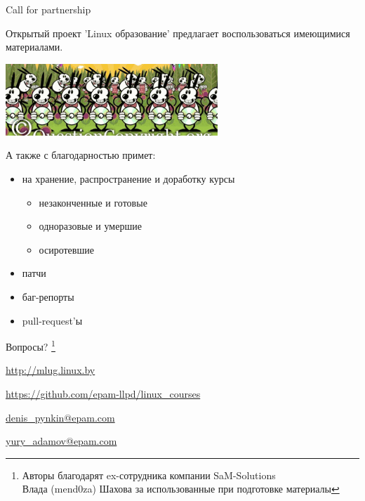 \begin{frame}{Call for partnership}
  
  \begin{center}
    Открытый проект 'Linux образование' предлагает воспользоваться имеющимися материалами.
    
    \includegraphics[width=0.6\textwidth]{copying}
  \end{center}

  А также с благодарностью примет:
  \begin{itemize}
    \item на хранение, распространение и доработку курсы
      \begin{itemize}
	\item незаконченные и готовые
	\item одноразовые и умершие
	\item осиротевшие
      \end{itemize}
    \item патчи
    \item баг-репорты
    \item pull-request'ы
  \end{itemize}

\end{frame}
\begin{frame}[fragile]{}

  \Large \alert{Вопросы?}  \footnote{Авторы благодарят ex-сотрудника компании SaM-Solutions \\
  Влада (mend0za) Шахова за использованные при подготовке материалы}

  \bigskip

  \href{http://mlug.linux.by}{http://mlug.linux.by}

  \href{https://github.com/epam-llpd/linux\_courses}{https://github.com/epam-llpd/linux\_courses}

  \hrulefill

  \href{mailto:denis\_pynkin@epam.com}{denis\_pynkin@epam.com}

  \href{mailto:yury\_adamov@epam.com}{yury\_adamov@epam.com}


\end{frame}


